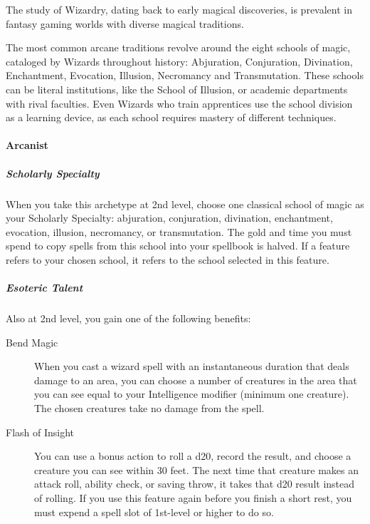 The study of Wizardry, dating back to early magical discoveries, is
prevalent in fantasy gaming worlds with diverse magical traditions.

The most common arcane traditions revolve around the eight schools of
magic, cataloged by Wizards throughout history: Abjuration, Conjuration,
Divination, Enchantment, Evocation, Illusion, Necromancy and
Transmutation. These schools can be literal institutions, like the
School of Illusion, or academic departments with rival faculties. Even
Wizards who train apprentices use the school division as a learning
device, as each school requires mastery of different techniques.

\paragraph{Arcanist}\label{wizard-subclass-arcanist}

\subparagraph{Scholarly
Specialty}\label{wizard-subclass-arcanist-scholarly-speciality}

When you take this archetype at 2nd level, choose one classical school
of magic as your Scholarly Specialty: abjuration, conjuration,
divination, enchantment, evocation, illusion, necromancy, or
transmutation. The gold and time you must spend to copy spells from this
school into your spellbook is halved. If a feature refers to your chosen
school, it refers to the school selected in this feature.

\subparagraph{Esoteric
Talent}\label{wizard-subclass-arcanist-esoteric-talent}

Also at 2nd level, you gain one of the following benefits:

\begin{description}
\item[Bend Magic]
When you cast a wizard spell with an instantaneous duration that deals
damage to an area, you can choose a number of creatures in the area that
you can see equal to your Intelligence modifier (minimum one creature).
The chosen creatures take no damage from the spell.
\end{description}

\begin{description}
\item[Flash of Insight]
You can use a bonus action to roll a d20, record the result, and choose
a creature you can see within 30 feet. The next time that creature makes
an attack roll, ability check, or saving throw, it takes that d20 result
instead of rolling. If you use this feature again before you finish a
short rest, you must expend a spell slot of 1st-level or higher to do
so.
\end{description}


